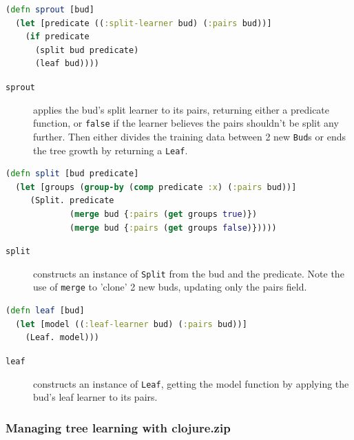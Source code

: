 \documentclass[10pt,openany]{article}
\numberwithin{definition}{section}
\numberwithin{example}{section}
\numberwithin{equation}{section}
\numberwithin{figure}{section}
\begin{document}
\begin{minipage}[t]{1\columnwidth}%
\begin{lstlisting}[caption={(sprout bud)},label={lis:sprout},language=clojure,tabsize=2]
(defn sprout [bud]
  (let [predicate ((:split-learner bud) (:pairs bud))]
    (if predicate
      (split bud predicate)
      (leaf bud))))
\end{lstlisting}
%
\end{minipage}
\begin{description}
\item [{\texttt{sprout}}] applies the bud's split learner to its pairs,
returning either a predicate function, or \texttt{false} if the learner
believes the pairs shouldn't be split any further. Then either divides
the training data between 2 new \texttt{Bud}s or ends the tree growth
by returning a \texttt{Leaf}.
\end{description}
\begin{minipage}[t]{1\columnwidth}%
\begin{lstlisting}[caption={(split bud)},label={lis:split},language=clojure,tabsize=2]
(defn split [bud predicate]
  (let [groups (group-by (comp predicate :x) (:pairs bud))]
     (Split. predicate
             (merge bud {:pairs (get groups true)})
             (merge bud {:pairs (get groups false)}))))
\end{lstlisting}
%
\end{minipage}
\begin{description}
\item [{\texttt{split}}] constructs an instance of \texttt{Split} from
the bud and the predicate. Note the use of \texttt{merge} to 'clone'
2 new buds, updating only the pairs field.
\end{description}
\begin{minipage}[t]{1\columnwidth}%
\begin{lstlisting}[caption={(leaf bud)},label={lis:leaf},language=clojure,tabsize=2]
(defn leaf [bud]
  (let [model ((:leaf-learner bud) (:pairs bud))]
    (Leaf. model)))
\end{lstlisting}
%
\end{minipage}
\begin{description}
\item [{\texttt{leaf}}] constructs an instance of \texttt{Leaf}, getting
the model function by applying the bud's leaf learner to its pairs.
\end{description}

\subsubsection{Managing tree learning with clojure.zip}
\end{document}
